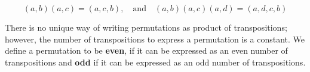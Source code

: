 \[
(a,b)(a,c) = (a,c,b), \quad \mbox{and} \quad (a,b)(a,c)(a,d) = (a,d,c,b)
\]

There is no unique way of writing permutations as product of transpositions; however, the number of transpositions to  express a permutation is a constant. We define a permutation to be \textbf{even}, if it can be expressed as an even number of transpositions and \textbf{odd} if it can be expressed as an odd number of transpositions.








